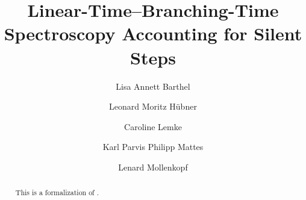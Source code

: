 \documentclass[11pt,a4paper]{article}
\begin{document}
\title{Linear-Time--Branching-Time Spectroscopy Accounting for Silent Steps}
\author{Lisa Annett Barthel \and Leonard Moritz Hübner \and Caroline Lemke \and Karl Parvis Philipp Mattes \and Lenard Mollenkopf}
\maketitle

\begin{abstract}
    This is a formalization of \cite{bisping2023lineartimebranchingtime}.
\end{abstract}

\tableofcontents


















\newpage
\appendix




\end{document}
